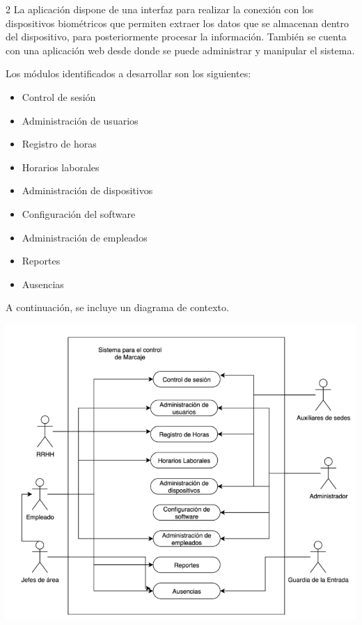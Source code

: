 \documentclass[12pt,spanish,Letterpaper,openany]{book}
\providecommand{\tightlist}{%
  \setlength{\itemsep}{0pt}\setlength{\parskip}{0pt}}
\begin{document}
\begin {multicols}{2}
La aplicación dispone de una interfaz para realizar la conexión con los dispositivos biométricos que permiten extraer los datos que se almacenan dentro del dispositivo, para posteriormente procesar la información. También se cuenta con una aplicación web desde donde se puede administrar y manipular el sistema.

Los módulos identificados a desarrollar son los siguientes:

\begin{itemize}
\tightlist
\item
  Control de sesión
\item
  Administración de usuarios
\item
  Registro de horas
\item
  Horarios laborales
\item
  Administración de dispositivos
\item
  Configuración del software
\item
  Administración de empleados
\item
  Reportes
\item
  Ausencias
\end{itemize}

A continuación, se incluye un diagrama de contexto.

\begin {flushleft}
\noindent\begin{minipage}[c]{\columnwidth}

\centering

\includegraphics[width=0.7\linewidth]{images/06_04}

\end{minipage}

\end {flushleft}


\end{multicols}
\end{document}
